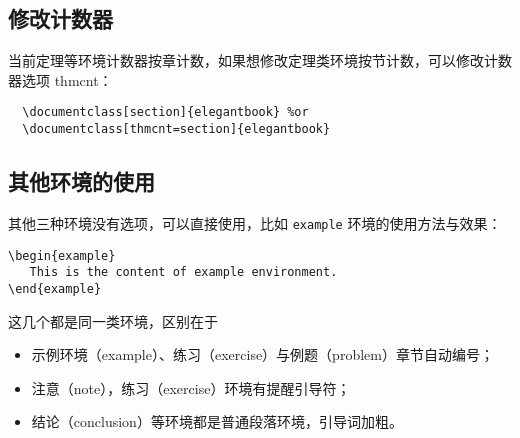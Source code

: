  


\subsection{修改计数器}

当前定理等环境计数器按章计数，如果想修改定理类环境按节计数，可以修改计数器选项 thmcnt：

\begin{lstlisting}
  \documentclass[section]{elegantbook} %or
  \documentclass[thmcnt=section]{elegantbook}
\end{lstlisting}


\subsection{其他环境的使用}

其他三种环境没有选项，可以直接使用，比如 \lstinline{example} 环境的使用方法与效果：
\begin{lstlisting}
\begin{example}
   This is the content of example environment.
\end{example}
\end{lstlisting}

这几个都是同一类环境，区别在于

\begin{itemize}
  \item 示例环境（example）、练习（exercise）与例题（problem）章节自动编号；
  \item 注意（note），练习（exercise）环境有提醒引导符；
  \item 结论（conclusion）等环境都是普通段落环境，引导词加粗。
\end{itemize}

